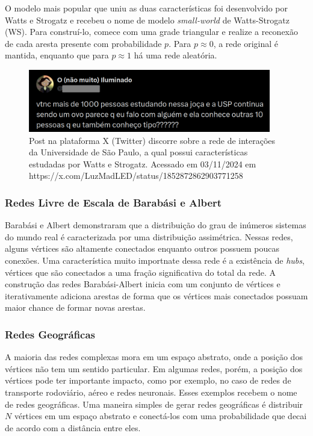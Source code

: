 O modelo mais popular que uniu as duas características foi desenvolvido
por Watts e Strogatz e recebeu o nome de modelo \emph{small-world} de
Watts-Strogatz (WS). Para construí-lo, comece com uma grade triangular e
realize a reconexão de cada aresta presente com probabilidade \(p\).
Para \(p\approx 0\), a rede original é mantida, enquanto que para
\(p\approx 1\) há uma rede aleatória.

\begin{figure}
\centering
\includegraphics[width=4.16667in,height=\textheight]{tweet_SW.png}
\caption{Post na plataforma X (Twitter) discorre sobre a rede de
interações da Universidade de São Paulo, a qual possui características
estudadas por Watts e Strogatz. Acessado em 03/11/2024 em
https://x.com/LuzMadLED/status/1852872862903771258}
\end{figure}

\subsubsection{Redes Livre de Escala de Barabási e
Albert}\label{redes-livre-de-escala-de-barabuxe1si-e-albert}

Barabási e Albert demonstraram que a distribuição do grau de inúmeros
sistemas do mundo real é caracterizada por uma distribuição assimétrica.
Nessas redes, alguns vértices são altamente conectados enquanto outros
possuem poucas conexões. Uma característica muito importnate dessa rede
é a existência de \emph{hubs}, vértices que são conectados a uma fração
significativa do total da rede. A construção das redes Barabási-Albert
inicia com um conjunto de vértices e iterativamente adiciona arestas de
forma que os vértices mais conectados possuam maior chance de formar
novas arestas.

\subsubsection{Redes Geográficas}\label{redes-geogruxe1ficas}

A maioria das redes complexas mora em um espaço abstrato, onde a posição
dos vértices não tem um sentido particular. Em algumas redes, porém, a
posição dos vértices pode ter importante impacto, como por exemplo, no
caso de redes de transporte rodoviário, aéreo e redes neuronais. Esses
exemplos recebem o nome de redes geográficas. Uma maneira simples de
gerar redes geográficas é distribuir \(N\) vértices em um espaço
abstrato e conectá-los com uma probabilidade que decai de acordo com a
distância entre eles.

